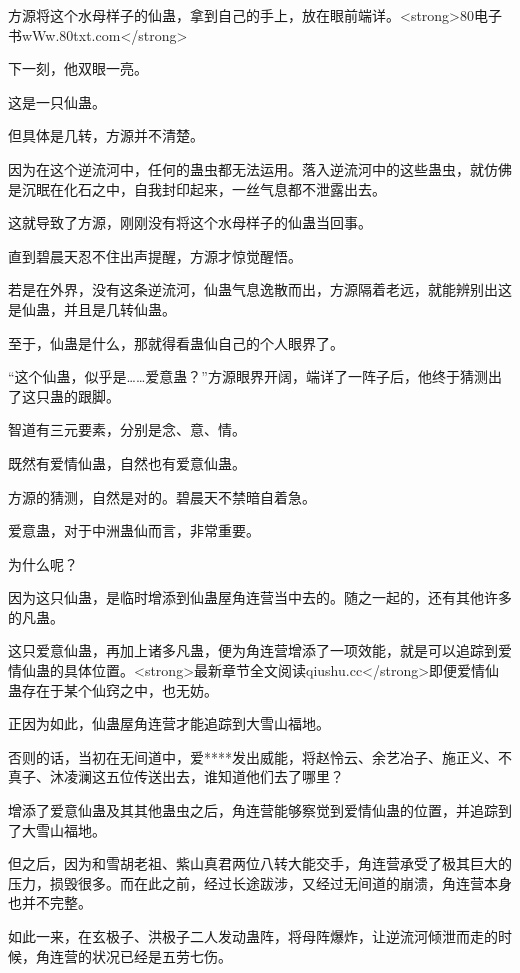 
\begin{this_body}

方源将这个水母样子的仙蛊，拿到自己的手上，放在眼前端详。<strong>80电子书wWw.80txt.com</strong>

下一刻，他双眼一亮。

这是一只仙蛊。

但具体是几转，方源并不清楚。

因为在这个逆流河中，任何的蛊虫都无法运用。落入逆流河中的这些蛊虫，就仿佛是沉眠在化石之中，自我封印起来，一丝气息都不泄露出去。

这就导致了方源，刚刚没有将这个水母样子的仙蛊当回事。

直到碧晨天忍不住出声提醒，方源才惊觉醒悟。

若是在外界，没有这条逆流河，仙蛊气息逸散而出，方源隔着老远，就能辨别出这是仙蛊，并且是几转仙蛊。

至于，仙蛊是什么，那就得看蛊仙自己的个人眼界了。

“这个仙蛊，似乎是……爱意蛊？”方源眼界开阔，端详了一阵子后，他终于猜测出了这只蛊的跟脚。

智道有三元要素，分别是念、意、情。

既然有爱情仙蛊，自然也有爱意仙蛊。

方源的猜测，自然是对的。碧晨天不禁暗自着急。

爱意蛊，对于中洲蛊仙而言，非常重要。

为什么呢？

因为这只仙蛊，是临时增添到仙蛊屋角连营当中去的。随之一起的，还有其他许多的凡蛊。

这只爱意仙蛊，再加上诸多凡蛊，便为角连营增添了一项效能，就是可以追踪到爱情仙蛊的具体位置。<strong>最新章节全文阅读qiushu.cc</strong>即便爱情仙蛊存在于某个仙窍之中，也无妨。

正因为如此，仙蛊屋角连营才能追踪到大雪山福地。

否则的话，当初在无间道中，爱****发出威能，将赵怜云、余艺冶子、施正义、不真子、沐凌澜这五位传送出去，谁知道他们去了哪里？

增添了爱意仙蛊及其其他蛊虫之后，角连营能够察觉到爱情仙蛊的位置，并追踪到了大雪山福地。

但之后，因为和雪胡老祖、紫山真君两位八转大能交手，角连营承受了极其巨大的压力，损毁很多。而在此之前，经过长途跋涉，又经过无间道的崩溃，角连营本身也并不完整。

如此一来，在玄极子、洪极子二人发动蛊阵，将母阵爆炸，让逆流河倾泄而走的时候，角连营的状况已经是五劳七伤。


\end{this_body}
